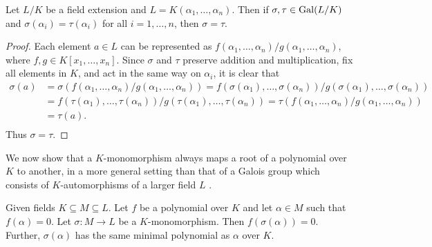 \begin{theorem} \label{thm:galois-group-determined-by-generator}
	Let $L/K$ be a field extension and $L = K(\alpha_1, \ldots, \alpha_n)$. Then if $\sigma, \tau \in \operatorname{Gal}(L/K)$ and $\sigma(\alpha_i) = \tau(\alpha_i)$ for all $i = 1, \dots, n$, then $\sigma = \tau$. 
\end{theorem}

\begin{proof}
	Each element $a \in L$ can be represented as $ f(\alpha_1, \dots, \alpha_n) / g(\alpha_1, \dots, \alpha_n)$, where $f, g \in K[x_1, \ldots, x_n]$. Since $\sigma$ and $\tau$ preserve addition and multiplication, fix all elements in $K$, and act in the same way on $\alpha_i$, it is clear that
	\begin{equation*}
		\begin{split}
		\sigma(a) 
			&= \sigma(f(\alpha_1, \dots, \alpha_n) / g(\alpha_1, \dots, \alpha_n)) 
			= f(\sigma(\alpha_1), \dots, \sigma(\alpha_n)) / g(\sigma(\alpha_1), \dots, \sigma(\alpha_n)) \\
			&= f(\tau(\alpha_1), \dots, \tau(\alpha_n)) / g(\tau(\alpha_1), \dots, \tau(\alpha_n))  
			=  \tau(f(\alpha_1, \dots, \alpha_n) / g(\alpha_1, \dots, \alpha_n)) \\
			&= \tau(a).\\ 
		\end{split}
	\end{equation*}
Thus $\sigma = \tau$.
\end{proof}






We now show that a $K$-monomorphism always maps a root of a polynomial over $K$ to another, in a more general setting than that of a Galois group which consists of $K$-automorphisms of a larger field $L$ \cite{morandi_field_1996}. 

\begin{theorem} \label{thm:galois-group-permutes-zeros}
Given fields $K \subseteq M \subseteq L$. Let $f$ be a polynomial over $K$ and let $\alpha \in M$ such that $f(\alpha) = 0$. Let $\sigma : M \to L$ be a $K$-monomorphism. Then $f(\sigma(\alpha)) = 0$. Further, $\sigma(\alpha)$ has the same minimal polynomial as $\alpha$ over $K$. 

\end{theorem}

